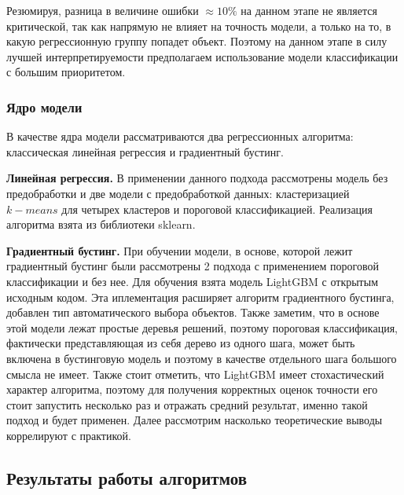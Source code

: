 \documentclass[12pt,a4paper]{article} %
\begin{document}
Резюмируя, разница в величине ошибки $\approx10\%$ на данном этапе не является критической, так как напрямую не влияет на точность модели, а только на то, в какую регрессионную группу попадет объект. Поэтому на данном этапе в силу лучшей интерпретируемости предполагаем использование модели классификации с большим приоритетом.  

\subsubsection{Ядро модели}

В качестве ядра модели рассматриваются два регрессионных алгоритма: классическая линейная регрессия и градиентный бустинг. 

\textbf{Линейная регрессия.} В применении данного подхода рассмотрены модель без предобработки и две модели с предобработкой данных: кластеризацией $k-means$ для четырех кластеров и пороговой классификацией. Реализация алгоритма взята из библиотеки sklearn.

\textbf{Градиентный бустинг.} При обучении модели, в основе, которой лежит градиентный бустинг были рассмотрены 2 подхода с применением пороговой классификации и без нее. Для обучения взята модель LightGBM с открытым исходным кодом. Эта иплементация расширяет алгоритм градиентного бустинга, добавлен тип автоматического выбора объектов. Также заметим, что в основе этой модели лежат простые деревья решений, поэтому пороговая классификация, фактически представляющая из себя дерево из одного шага, может быть включена в бустинговую модель и поэтому в качестве отдельного шага большого смысла не имеет. Также стоит отметить, что LightGBM имеет стохастический характер алгоритма, поэтому для получения корректных оценок точности его стоит запустить несколько раз и отражать средний результат, именно такой подход и будет применен. Далее рассмотрим насколько теоретические выводы коррелируют с практикой.

\subsection{Результаты работы алгоритмов}
\end{document}
